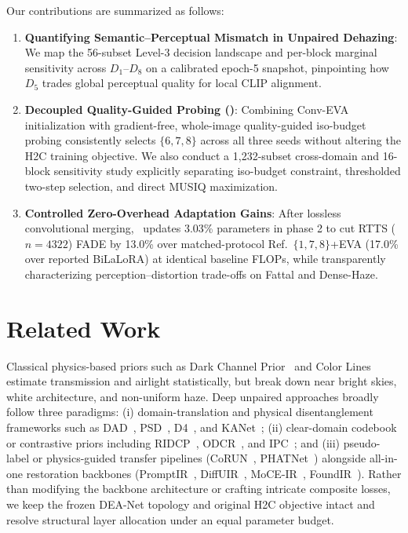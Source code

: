 \documentclass[10pt,twocolumn,letterpaper]{article}
\begin{document}
Our contributions are summarized as follows:
\begin{enumerate}\setlength{\itemsep}{1pt}\setlength{\parskip}{0pt}
\item \textbf{Quantifying Semantic--Perceptual Mismatch in Unpaired Dehazing}: We map the 56-subset Level-3 decision landscape and per-block marginal sensitivity across $D_1$--$D_8$ on a calibrated epoch-5 snapshot, pinpointing how $D_5$ trades global perceptual quality for local CLIP alignment.
\item \textbf{Decoupled Quality-Guided Probing (\method)}: Combining Conv-EVA initialization with gradient-free, whole-image quality-guided iso-budget probing consistently selects $\{6,7,8\}$ across all three seeds without altering the H2C training objective. We also conduct a 1,232-subset cross-domain and 16-block sensitivity study explicitly separating iso-budget constraint, thresholded two-step selection, and direct MUSIQ maximization.
\item \textbf{Controlled Zero-Overhead Adaptation Gains}: After lossless convolutional merging, \method~updates 3.03\% parameters in phase 2 to cut RTTS ($n=4322$) FADE by 13.0\% over matched-protocol Ref.~\(\{1,7,8\}\)+EVA (17.0\% over reported BiLaLoRA) at identical baseline FLOPs, while transparently characterizing perception--distortion trade-offs on Fattal and Dense-Haze.
\end{enumerate}

\section{Related Work}
Classical physics-based priors such as Dark Channel Prior~\cite{dcp2009} and Color Lines~\cite{fattal2014} estimate transmission and airlight statistically, but break down near bright skies, white architecture, and non-uniform haze. Deep unpaired approaches broadly follow three paradigms: (i) domain-translation and physical disentanglement frameworks such as DAD~\cite{dad2020}, PSD~\cite{psd2021}, D4~\cite{d42022}, and KANet~\cite{kanet2024}; (ii) clear-domain codebook or contrastive priors including RIDCP~\cite{ridcp2023}, ODCR~\cite{odcr2024}, and IPC~\cite{ipc2025}; and (iii) pseudo-label or physics-guided transfer pipelines (CoRUN~\cite{corun2024}, PHATNet~\cite{phatnet2025}) alongside all-in-one restoration backbones (PromptIR~\cite{promptir2023}, DiffUIR~\cite{diffuir2024}, MoCE-IR~\cite{moce2025}, FoundIR~\cite{foundir2025}). Rather than modifying the backbone architecture or crafting intricate composite losses, we keep the frozen DEA-Net topology and original H2C objective intact and resolve structural layer allocation under an equal parameter budget.
\end{document}
